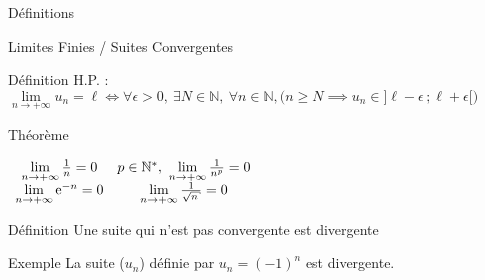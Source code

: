 \documentclass{cours}
\begin{document}
\begin{Gpartie}{Définitions}
\begin{Spartie}{Limites Finies / Suites Convergentes}
\begin{SSpartie}{Définition}
                H.P. : $\lim\limits_{n\to +\infty} u_n=\ell\iff\forall\epsilon >0,\ \exists N\in\mathbb{N},\ \forall n\in\mathbb{N}, \Big(n\geq N\implies u_n\in\big]\ell-\epsilon\,;\ell+\epsilon\big[\Big)$
            \end{SSpartie}
            \begin{SSpartie}{Théorème} 
                \begin{center}$\begin{array}{cc}
                    \lim\limits_{n\to +\infty}\frac{1}{n}=0 & p\in\mathbb{N^*},\ \lim\limits_{n\to +\infty}\frac{1}{n^p}=0 \\
                    \lim\limits_{n\to +\infty}\me^{-n}=0 & \lim\limits_{n\to +\infty}\frac{1}{\sqrt{n}}=0
                \end{array}$\end{center}
            \end{SSpartie}
            \begin{SSpartie}{Définition} 
                Une suite qui n'est pas convergente est divergente
            \end{SSpartie}
            \begin{SSpartie}{Exemple} 
                La suite ($u_n$) définie par $u_n=(-1)^n$ est divergente.
            \end{SSpartie}
        \end{Spartie}
    \end{Gpartie}
    \pagebreak
\end{document}

